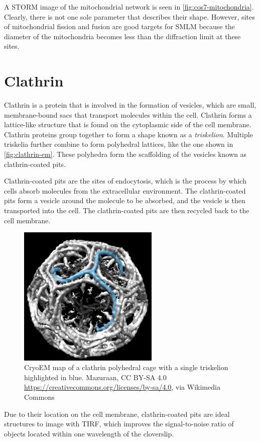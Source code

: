 \documentclass[10pt,a4paper,oneside]{book}
\begin{document}
A STORM image of the mitochondrial network is seen in \autoref{fig:cos7-mitochondria}. Clearly, there is not one sole parameter that describes their shape. However, sites of mitochondrial fission and fusion are good targets for SMLM because the diameter of the mitochondria becomes less than the diffraction limit at these sites.

\section{Clathrin}

Clathrin is a protein that is involved in the formation of vesicles, which are small, membrane-bound sacs that transport molecules within the cell. Clathrin forms a lattice-like structure that is found on the cytoplasmic side of the cell membrane. Clathrin proteins group together to form a shape known as a \textit{triskelion}. Multiple triskelia further combine to form polyhedral lattices, like the one shown in \autoref{fig:clathrin-em}. These polyhedra form the scaffolding of the vesicles known as clathrin-coated pits.

Clathrin-coated pits are the sites of endocytosis, which is the process by which cells absorb molecules from the extracellular environment. The clathrin-coated pits form a vesicle around the molecule to be absorbed, and the vesicle is then transported into the cell. The clathrin-coated pits are then recycled back to the cell membrane.

\begin{figure}
    \centering
    \includegraphics[width=0.6\textwidth]{clathrin-em.jpg}
    \caption{CryoEM map of a clathrin polyhedral cage with a single triskelion highlighted in blue. Mazuraan, CC BY-SA 4.0 \url{https://creativecommons.org/licenses/by-sa/4.0}, via Wikimedia Commons}
    \label{fig:clathrin-em}
\end{figure}

Due to their location on the cell membrane, clathrin-coated pits are ideal structures to image with TIRF, which improves the signal-to-noise ratio of objects located within one wavelength of the cloverslip.





\end{document}
